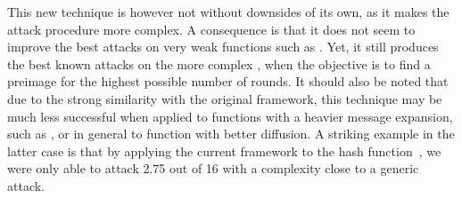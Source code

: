 This new technique is however not without downsides of its own, as it makes the attack procedure more complex. A consequence is
that it does not seem to improve the best attacks on very weak functions such as \mdfour. Yet, it still produces the best known
attacks on the more complex \shaone, when the objective is to find a preimage for the highest possible number of rounds.
It should also be noted that due to the strong similarity with the original \mitm framework, this technique may be
much less successful when applied to functions with a heavier message expansion, such as \shatwo, or in general to
function with better diffusion. A striking example in the latter case is that by applying the current framework
to the  hash function~\cite{blake}, we were only able to attack 2.75 out of 16 with a complexity close to a generic attack. 


